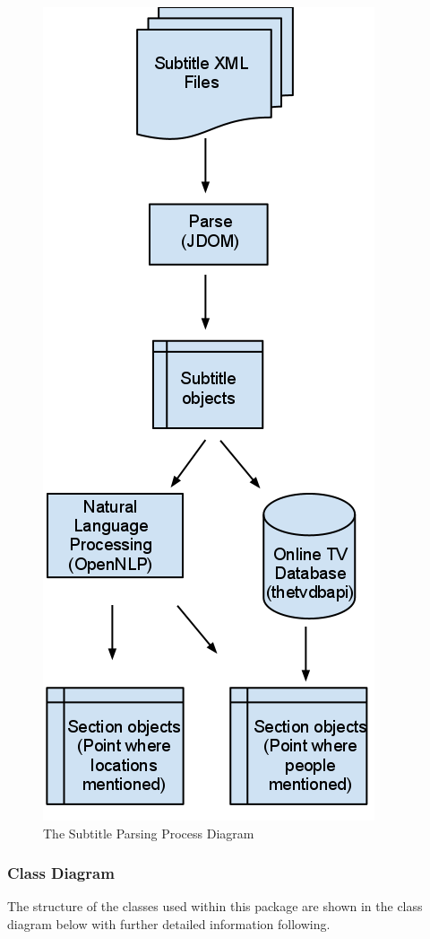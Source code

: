 \begin{figure}[h1]
\begin{center}
 \includegraphics[trim = 0mm 0mm 0mm 0mm, clip,
 scale=0.45]{Images/Subtitleparsingprocess.png}
  \caption{The Subtitle Parsing Process Diagram}
 \end{center}
\end{figure}

\subsubsection{Class Diagram}
The structure of the classes used within this package are shown in the class diagram below with further detailed information following.

